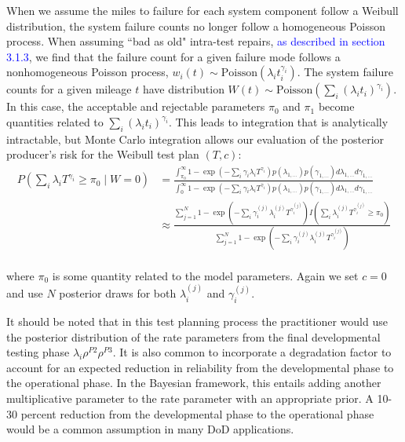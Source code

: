 \documentclass[12pt]{article}
\begin{document}
When we assume the miles to failure for each system component follow a Weibull
distribution, the system failure counts no longer follow a homogeneous Poisson
process.  When assuming ``bad as old" intra-test repairs, \textcolor{blue}{as described in section 3.1.3}, we find that the
failure count for a given failure mode follows a nonhomogeneous Poisson
process, $w_i(t) \sim \text{Poisson}( \lambda_i t_i^{\gamma_i} )$.  The system
failure counts for a given mileage $t$ have distribution $W(t) \sim
\text{Poisson}(\sum_i (\lambda_i t_i)^{\gamma_i})$.  In this case, the acceptable
and rejectable parameters $\pi_0$ and $\pi_1$ become quantities related to
$\sum_i (\lambda_i t_i)^{\gamma_i}$.  This leads to integration that is analytically intractable, but Monte Carlo integration
allows our evaluation of the posterior producer's risk for the Weibull test plan
$(T,c)$:
$$
\begin{aligned}
	 P(\sum_i \lambda_i T^{\gamma_i} \geq \pi_0 \; \vert \; W = 0) &= \frac{
	 \int_{\pi_0}^{\infty} 1 - \exp(- \sum_i \gamma_i \lambda_i
	 T^{\gamma_i})p(\lambda_{1,...}) p(\gamma_{1,...}) d\lambda_{1,...}
	 d\gamma_{1,...}} {\int_{0}^{\infty} 1 - \exp(- \sum_i \gamma_i \lambda_i
	 T^{\gamma_i})p(\lambda_{1,...}) p(\gamma_{1,...}) d\lambda_{1,...}
	 d\gamma_{1,...}} \\
   &\approx \frac{\sum_{j = 1}^{N} 1 - \exp(-\sum_i \gamma_i^{(j)}
   \lambda_i^{(j)} T^{\gamma_i^{(j)}}) I(\sum_i \lambda_i^{(j)}
   T^{\gamma_i^{(j)}} \geq \pi_0)} {\sum_{j = 1}^{N} 1 - \exp(- \sum_i
   \gamma_i^{(j)} \lambda_i^{(j)} T^{\gamma_i^{(j)}})}
\end{aligned}
$$
\\
where $\pi_0$ is some quantity related to the model parameters.  Again we set $c = 0$ and use $N$ posterior draws for both $\lambda_i^{(j)}$ and
$\gamma_i^{(j)}$.

It should be noted that in this test planning process the practitioner would use
the posterior distribution of the rate parameters from the final developmental
testing phase $\lambda_i\rho^{P2}\rho^{P3}$.  It is also common to incorporate a
degradation factor to account for an expected reduction in reliability from the
developmental phase to the operational phase.  In the Bayesian framework, this
entails adding another multiplicative parameter to the rate parameter with an
appropriate prior.   A 10-30 percent reduction from the developmental phase to
the operational phase would be a common assumption in many DoD applications.
\end{document}
